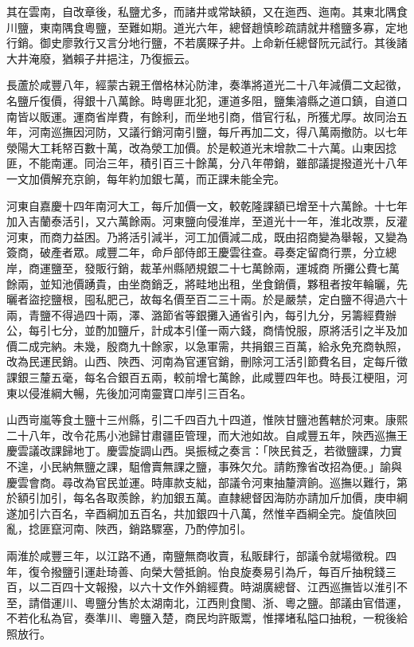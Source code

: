 \begin{pinyinscope}
其在雲南，自改章後，私鹽尤多，而諸井或常缺額，又在迤西、迤南。其東北隅食川鹽，東南隅食粵鹽，至難如期。道光六年，總督趙慎畛疏請就井稽鹽多寡，定地行銷。御史廖敦行又言分地行鹽，不若廣賝子井。上命新任總督阮元試行。其後諸大井淹廢，猶賴子井挹注，乃復振云。

長蘆於咸豐八年，經蒙古親王僧格林沁防津，奏準將道光二十八年減價二文起徵，名鹽斤復價，得銀十八萬餘。時粵匪北犯，運道多阻，鹽集濬縣之道口鎮，自道口南皆以販運。運商省岸費，有餘利，而坐地引商，借官行私，所獲尤厚。故同治五年，河南巡撫因河防，又議行銷河南引鹽，每斤再加二文，得八萬兩撤防。以七年滎陽大工耗帑百數十萬，改為滎工加價。於是較道光末增款二十六萬。山東因捻匪，不能南運。同治三年，積引百三十餘萬，分八年帶銷，雖部議提撥道光十八年一文加價解充京餉，每年約加銀七萬，而正課未能全完。

河東自嘉慶十四年南河大工，每斤加價一文，較乾隆課額已增至十六萬餘。十七年加入吉蘭泰活引，又六萬餘兩。河東鹽向侵淮岸，至道光十一年，淮北改票，反灌河東，而商力益困。乃將活引減半，河工加價減二成，既由招商變為舉報，又變為簽商，破產者眾。咸豐二年，命戶部侍郎王慶雲往查。尋奏定留商行票，分立總岸，商運鹽至，發販行銷，裁革州縣陋規銀二十七萬餘兩，運城商所攤公費七萬餘兩，並知池價踴貴，由坐商銷乏，將畦地出租，坐食銷價，夥租者按年輪曬，先曬者盜挖鹽根，囤私肥己，故每名價至百二三十兩。於是嚴禁，定白鹽不得過六十兩，青鹽不得過四十兩，澤、潞節省等銀攤入通省引內，每引九分，另籌經費辦公，每引七分，並酌加鹽斤，計成本引僅一兩六錢，商情悅服，原將活引之半及加價二成完納。未幾，殷商九十餘家，以急軍需，共捐銀三百萬，給永免充商執照，改為民運民銷。山西、陜西、河南為官運官銷，刪除河工活引節費名目，定每斤徵課銀三釐五毫，每名合銀百五兩，較前增七萬餘，此咸豐四年也。時長江梗阻，河東以侵淮綱大暢，先後加河南靈寶口岸引三百名。

山西岢嵐等食土鹽十三州縣，引二千四百九十四道，惟陜甘鹽池舊轄於河東。康熙二十八年，改令花馬小池歸甘肅疆臣管理，而大池如故。自咸豐五年，陜西巡撫王慶雲議改課歸地丁。慶雲旋調山西。吳振棫之奏言：「陜民貧乏，若徵鹽課，力實不遑，小民納無鹽之課，駔儈賣無課之鹽，事殊欠允。請飭豫省改招為便。」諭與慶雲會商。尋改為官民並運。時庫款支絀，部議令河東抽釐濟餉。巡撫以難行，第於額引加引，每名各取羨餘，約加銀五萬。直隸總督因海防亦請加斤加價，庚申綱遂加引六百名，辛酉綱加五百名，共加銀四十八萬，然惟辛酉綱全完。旋值陜回亂，捻匪竄河南、陜西，銷路驟塞，乃酌停加引。

兩淮於咸豐三年，以江路不通，南鹽無商收賣，私販肆行，部議令就場徵稅。四年，復令撥鹽引運赴琦善、向榮大營抵餉。怡良旋奏易引為斤，每百斤抽稅錢三百，以二百四十文報撥，以六十文作外銷經費。時湖廣總督、江西巡撫皆以淮引不至，請借運川、粵鹽分售於太湖南北，江西則食閩、浙、粵之鹽。部議由官借運，不若化私為官，奏準川、粵鹽入楚，商民均許販鬻，惟擇堵私隘口抽稅，一稅後給照放行。


\end{pinyinscope}
